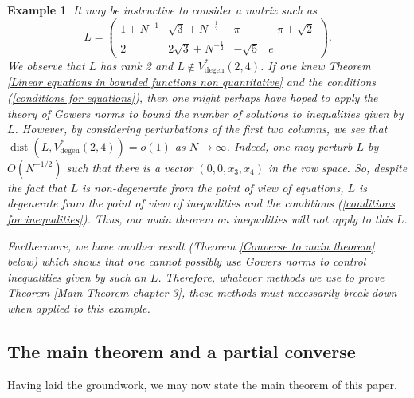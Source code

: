 \documentclass[12pt,a4paper,twoside,reqno]{amsart}
\newtheorem{Example}[Theorem]{Example}
\newcommand{\degen}{\operatorname{degen}}
\numberwithin{equation}{section}
\begin{document}
\begin{Example}
\label{Example bad behaviour}
\emph{It may be instructive to consider a matrix such as $$L = \left(\begin{matrix}
1 +N^{-1}& \sqrt{3}+N^{-\frac{1}{2}} & \pi & -\pi+\sqrt{2} \\
2 & 2\sqrt{3}+N^{-\frac{1}{2}} & -\sqrt{5} & e
\end{matrix} \right).$$ We observe that $L$ has rank 2 and $L\notin V_{\degen}^*(2,4)$. If one knew Theorem \ref{Linear equations in bounded functions non quantitative} and the conditions (\ref{conditions for equations}), then one might perhaps have hoped to apply the theory of Gowers norms to bound the number of solutions to inequalities given by $L$. However, by considering perturbations of the first two columns, we see that $\operatorname{dist}(L,V_{\degen}^*(2,4))=o(1)$ as $N\rightarrow \infty$. Indeed, one may perturb $L$ by $O(N^{-1/2})$ such that there is a vector $(0,0,x_3,x_4)$ in the row space. So, despite the fact that $L$ is non-degenerate from the point of view of equations, $L$ \emph{is} degenerate from the point of view of inequalities and the conditions (\ref{conditions for inequalities}). Thus, our main theorem on inequalities will not apply to this $L$. }

\emph{Furthermore, we have another result (Theorem \ref{Converse to main theorem} below) which shows that one cannot possibly use Gowers norms to control inequalities given by such an $L$. Therefore, whatever methods we use to prove Theorem \ref{Main Theorem chapter 3}, these methods must necessarily break down when applied to this example.}\\
\end{Example}




\subsection{The main theorem and a partial converse}
\label{The main theorem and partial converse}
Having laid the groundwork, we may now state the main theorem of this paper. 
\end{document}
